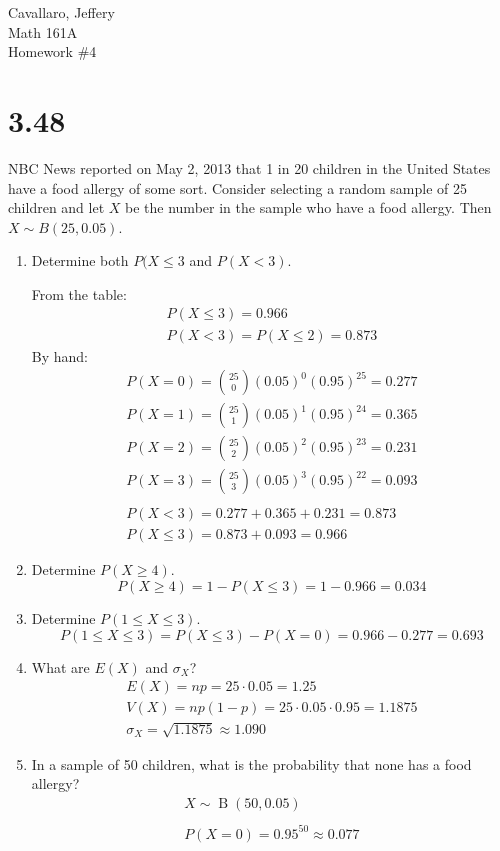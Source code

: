 \documentclass[letterpaper,12pt,fleqn]{article}
\DeclareMathOperator{\bin}{B}
\renewcommand{\o}{\sigma}
\begin{document}
Cavallaro, Jeffery \\
Math 161A \\
Homework \#4

\bigskip

\section*{3.48}

NBC News reported on May 2, 2013 that 1 in 20 children in the United States have a food allergy of some sort.  Consider
selecting a random sample of 25 children and let \(X\) be the number in the sample who have a food allergy.  Then
\(X\sim B(25,0.05)\).

\begin{enumerate}[label={\alph*)}]
\item Determine both \(P(X\le3\) and \(P(X<3)\).
  
  From the table:
  \begin{gather*}
    P(X\le3)=0.966 \\
    P(X<3)=P(X\le2)=0.873
  \end{gather*}
  By hand:
  \begin{gather*}
    P(X=0)=\binom{25}{0}(0.05)^0(0.95)^{25}=0.277 \\
    P(X=1)=\binom{25}{1}(0.05)^1(0.95)^{24}=0.365 \\
    P(X=2)=\binom{25}{2}(0.05)^2(0.95)^{23}=0.231 \\
    P(X=3)=\binom{25}{3}(0.05)^3(0.95)^{22}=0.093 \\
    \\
    P(X<3)=0.277+0.365+0.231=0.873 \\
    P(X\le3)=0.873+0.093=0.966
  \end{gather*}

\item Determine \(P(X\ge4)\).
  \[P(X\ge4)=1-P(X\le3)=1-0.966=0.034\]

\item Determine \(P(1\le X\le 3)\).
  \[P(1\le X\le 3)=P(X\le3)-P(X=0)=0.966-0.277=0.693\]

\item What are \(E(X)\) and \(\o_X\)?
  \begin{gather*}
    E(X)=np=25\cdot0.05=1.25 \\
    V(X)=np(1-p)=25\cdot0.05\cdot0.95=1.1875 \\
    \o_X=\sqrt{1.1875}\approx1.090
  \end{gather*}

\item In a sample of 50 children, what is the probability that none has a food allergy?
  \begin{gather*}
    X\sim\bin(50,0.05) \\
    \\
    P(X=0)=0.95^{50}\approx0.077
  \end{gather*}
\end{enumerate}
\end{document}
